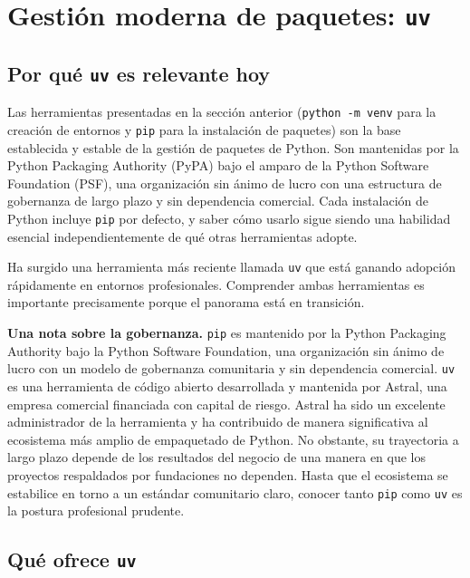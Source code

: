 \section{Gestión moderna de paquetes: \texttt{uv}}
\label{sec:uv}

\subsection{Por qué \texttt{uv} es relevante hoy}

Las herramientas presentadas en la sección anterior (\texttt{python -m venv}
para la creación de entornos y \texttt{pip} para la instalación de paquetes)
son la base establecida y estable de la gestión de paquetes de Python. Son
mantenidas por la Python Packaging Authority (PyPA) bajo el amparo de la
Python Software Foundation (PSF), una organización sin ánimo de lucro con
una estructura de gobernanza de largo plazo y sin dependencia comercial.
Cada instalación de Python incluye \texttt{pip} por defecto, y saber cómo
usarlo sigue siendo una habilidad esencial independientemente de qué otras
herramientas adopte.

Ha surgido una herramienta más reciente llamada \texttt{uv} que está ganando
adopción rápidamente en entornos profesionales. Comprender ambas
herramientas es importante precisamente porque el panorama está en
transición.

\begin{infobox}
\textbf{Una nota sobre la gobernanza.} \texttt{pip} es mantenido por la
Python Packaging Authority bajo la Python Software Foundation, una
organización sin ánimo de lucro con un modelo de gobernanza comunitaria y
sin dependencia comercial. \texttt{uv} es una herramienta de código abierto
desarrollada y mantenida por Astral, una empresa comercial financiada con
capital de riesgo. Astral ha sido un excelente administrador de la
herramienta y ha contribuido de manera significativa al ecosistema más
amplio de empaquetado de Python. No obstante, su trayectoria a largo plazo
depende de los resultados del negocio de una manera en que los proyectos
respaldados por fundaciones no dependen. Hasta que el ecosistema se
estabilice en torno a un estándar comunitario claro, conocer tanto
\texttt{pip} como \texttt{uv} es la postura profesional prudente.
\end{infobox}

\subsection{Qué ofrece \texttt{uv}}

